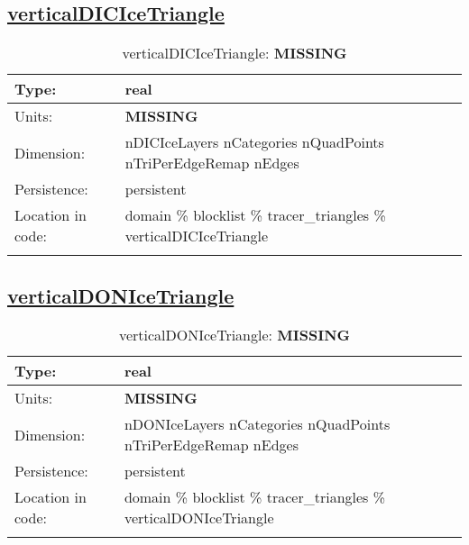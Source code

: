 \subsection[verticalDICIceTriangle]{\hyperref[sec:var_tab_tracer_triangles]{verticalDICIceTriangle}}
\label{subsec:var_sec_tracer_triangles_verticalDICIceTriangle}
\begin{center}
\begin{longtable}{| p{2.0in} | p{4.0in} |}
        \hline 
        Type: & real \\
        \hline 
        Units: & {\bf \color{red} MISSING} \\
        \hline 
        Dimension: & nDICIceLayers nCategories nQuadPoints nTriPerEdgeRemap nEdges \\
        \hline 
        Persistence: & persistent \\
        \hline 
         Location in code: & domain \% blocklist \% tracer\_triangles \% verticalDICIceTriangle \\
         \hline 
    \caption{verticalDICIceTriangle: {\bf \color{red} MISSING}}
\end{longtable}
\end{center}
\subsection[verticalDONIceTriangle]{\hyperref[sec:var_tab_tracer_triangles]{verticalDONIceTriangle}}
\label{subsec:var_sec_tracer_triangles_verticalDONIceTriangle}
\begin{center}
\begin{longtable}{| p{2.0in} | p{4.0in} |}
        \hline 
        Type: & real \\
        \hline 
        Units: & {\bf \color{red} MISSING} \\
        \hline 
        Dimension: & nDONIceLayers nCategories nQuadPoints nTriPerEdgeRemap nEdges \\
        \hline 
        Persistence: & persistent \\
        \hline 
         Location in code: & domain \% blocklist \% tracer\_triangles \% verticalDONIceTriangle \\
         \hline 
    \caption{verticalDONIceTriangle: {\bf \color{red} MISSING}}
\end{longtable}
\end{center}
